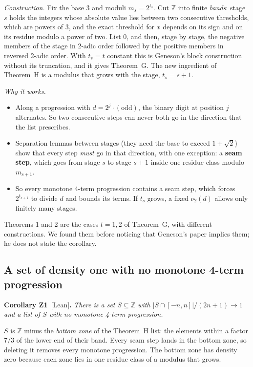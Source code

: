 \documentclass[11pt,letterpaper]{article}
\newcommand{\Z}{\mathbb{Z}}
\newcommand{\nut}{\nu_2}
\newcommand{\st}[1]{\textnormal{\textsf{\small[#1]}}}
\newenvironment{result}[2]%
  {\par\medskip\noindent\textbf{#1}\ \st{#2}\textbf{.}\enspace\itshape}%
  {\par\medskip}
\newcommand{\idea}[1]{\par\smallskip\noindent\textit{#1.}\enspace}
\begin{document}
\idea{Construction} Fix the base 3 and moduli $m_s = 2^{t_s}$. Cut $\Z$ into finite \emph{bands}: stage $s$
holds the integers whose absolute value lies between two consecutive thresholds, which are powers of 3, and
the exact threshold for $x$ depends on its sign and on its residue modulo a power of two. List 0, and then,
stage by stage, the negative members of the stage in 2-adic order followed by the positive members in
reversed 2-adic order. With $t_s = t$ constant this is Geneson's block construction without its truncation,
and it gives Theorem~G. The new ingredient of Theorem~H is a modulus that grows with the stage,
$t_s = s+1$.

\idea{Why it works}
\begin{itemize}
\item Along a progression with $d = 2^j \cdot (\text{odd})$, the binary digit at position $j$ alternates. So
two consecutive steps can never both go in the direction that the list prescribes.
\item Separation lemmas between stages (they need the base to exceed $1+\sqrt2$) show that every step
\emph{must} go in that direction, with one exception: a \textbf{seam step}, which goes from stage $s$ to
stage $s+1$ inside one residue class modulo $m_{s+1}$.
\item So every monotone 4-term progression contains a seam step, which forces $2^{t_{s+1}}$ to divide $d$ and
bounds its terms. If $t_s$ grows, a fixed $\nut(d)$ allows only finitely many stages.
\end{itemize}
Theorems 1 and 2 are the cases $t = 1, 2$ of Theorem~G, with different constructions. We found them before
noticing that Geneson's paper implies them; he does not state the corollary.

\subsection{A set of density one with no monotone 4-term progression}

\begin{result}{Corollary Z1}{Lean}
There is a set $S \subseteq \Z$ with $|S \cap [-n,n]|/(2n+1) \to 1$ and a list of $S$ with no monotone
4-term progression.
\end{result}

$S$ is $\Z$ minus the \emph{bottom zone} of the Theorem~H list: the elements within a factor $7/3$ of the
lower end of their band. Every seam step lands in the bottom zone, so deleting it removes every monotone
progression. The bottom zone has density zero because each zone lies in one residue class of a modulus that
grows.
\end{document}
